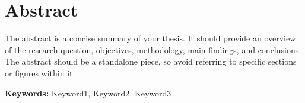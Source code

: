 \chapter*{Abstract}

The abstract is a concise summary of your thesis. It should provide an overview of the research question, objectives, methodology, main findings, and conclusions. The abstract should be a standalone piece, so avoid referring to specific sections or figures within it.

\begin{center}
    \textbf{Keywords:} Keyword1, Keyword2, Keyword3
\end{center}

